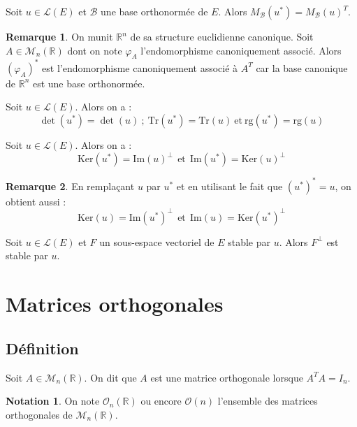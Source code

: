 \documentclass[french]{article}
\newcommand{\R}{\mathbb{R}}
\newcommand{\st}{^*}
\renewcommand{\ker}{\text{Ker}}
\newcommand{\Tr}{\text{Tr}}
\theoremstyle{plain}
\theoremstyle{definition}
\newtheorem*{rmq}{Remarque}
\newtheorem*{notation}{Notation}
\theoremstyle{remark}
\begin{document}
\begin{prop}
	Soit $u\in\mathcal{L}(E)$ et $\mathcal{B}$ une base orthonormée de $E$. Alors $M_\mathcal{B}(u\st)=M_\mathcal{B}(u)^T$.
\end{prop}

\begin{rmq}
	On munit $\R^n$ de sa structure euclidienne canonique. Soit $A\in\mathcal{M}_n(\R)$ dont on note $\varphi_A$ l'endomorphisme canoniquement associé. Alors $(\varphi_A)\st$ est l'endomorphisme canoniquement associé à $A^T$ car la base canonique de $\R^n$ est une base orthonormée.
\end{rmq}

\begin{cor}
	Soit $u\in\mathcal{L}(E)$. Alors on a : $$\det(u\st)=\det(u)\ ; \ \Tr(u\st)=\Tr(u)\ \text{et}\ \text{rg}(u\st)=\text{rg}(u)$$
\end{cor}

\begin{prop}
	Soit $u\in\mathcal{L}(E)$. Alors on a : $$\ker(u\st)=\text{Im}(u)^\bot \ \ \text{et} \ \ \text{Im}(u\st)=\ker(u)^\bot$$
\end{prop}

\begin{rmq}
	En remplaçant $u$ par $u\st$ et en utilisant le fait que $(u\st)\st=u$, on obtient aussi : $$\ker(u)=\text{Im}(u\st)^\bot \ \ \text{et} \ \ \text{Im}(u)=\ker(u\st)^\bot$$
\end{rmq}

\begin{lem}
	Soit $u\in\mathcal{L}(E)$ et $F$ un sous-espace vectoriel de $E$ stable par $u$. Alors $F^\bot$ est stable par $u$.
\end{lem}

\section{Matrices orthogonales}

\subsection{Définition}

\begin{dfn}
	Soit $A\in\mathcal{M}_n(\R)$. On dit que $A$ est une matrice orthogonale lorsque $A^TA=I_n$.
\end{dfn}

\begin{notation}
	On note $\mathcal{O}_n(\R)$ ou encore $\mathcal{O}(n)$ l'ensemble des matrices orthogonales de $\mathcal{M}_n(\R)$.
\end{notation}
\end{document}
